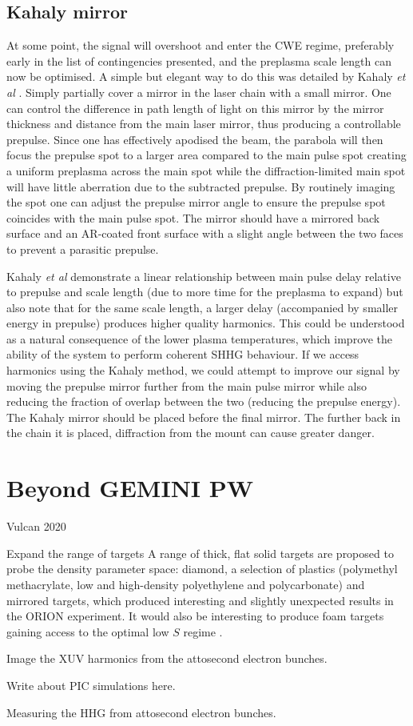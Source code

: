 \subsection{Kahaly mirror}
At some point, the signal will overshoot and enter the CWE regime, preferably early in the list of contingencies presented, and the preplasma scale length can now be optimised. A simple but elegant way to do this was detailed by Kahaly \textit{et al} \cite{kahalyDirectObservationDensityGradient2013}. Simply partially cover a mirror in the laser chain with a small mirror. One can control the difference in path length of light on this mirror by the mirror thickness and distance from the main laser mirror, thus producing a controllable prepulse. Since one has effectively apodised the beam, the parabola will then focus the prepulse spot to a larger area compared to the main pulse spot creating a uniform preplasma across the main spot while the diffraction-limited main spot will have little aberration due to the subtracted prepulse. By routinely imaging the spot one can adjust the prepulse mirror angle to ensure the prepulse spot coincides with the main pulse spot. The mirror should have a mirrored back surface and an AR-coated front surface with a slight angle between the two faces to prevent a parasitic prepulse.

Kahaly \textit{et al} demonstrate a linear relationship between main pulse delay relative to prepulse and scale length (due to more time for the preplasma to expand) but also note that for the same scale length, a larger delay (accompanied by smaller energy in prepulse) produces higher quality harmonics. This could be understood as a natural consequence of the lower plasma temperatures, which improve the ability of the system to perform coherent SHHG behaviour. If we access harmonics using the Kahaly method, we could attempt to improve our signal by moving the prepulse mirror further from the main pulse mirror while also reducing the fraction of overlap between the two (reducing the prepulse energy). The Kahaly mirror should be placed before the final mirror. The further back in the chain it is placed, diffraction from the mount can cause greater danger.



\section{Beyond GEMINI PW}\label{sec:ch4-beyond}
Vulcan 2020

Expand the range of targets A range of thick, flat solid targets are proposed to probe the density parameter space: diamond, a selection of plastics (polymethyl methacrylate, low and high-density polyethylene and polycarbonate) and mirrored targets, which produced interesting and slightly unexpected results in the ORION experiment. It would also be interesting to produce foam targets gaining access to the optimal low $S$ regime \cite{bataniPhysicsIssuesShock2014}.

Image the XUV harmonics from the attosecond electron bunches.

Write about PIC simulations here.

Measuring the HHG from attosecond electron bunches.







